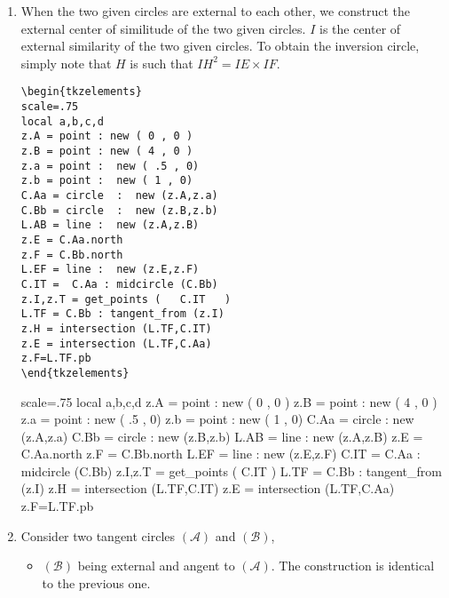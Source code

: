 \begin{enumerate}[label=(\roman*)]
\item When the two given circles are external to each other,  we  construct  the external center of similitude of the two given circles.
$I$ is the center of external similarity of the two given circles. To obtain the inversion circle, simply note that $H$ is such that $IH^2= IE\times IF$. \label{tangent_from}

\begin{minipage}{.4\textwidth}
\begin{verbatim}
\begin{tkzelements}
scale=.75
local a,b,c,d
z.A = point : new ( 0 , 0 )
z.B = point : new ( 4 , 0 )
z.a = point :  new ( .5 , 0)
z.b = point :  new ( 1 , 0)
C.Aa = circle  :  new (z.A,z.a)
C.Bb = circle  :  new (z.B,z.b)
L.AB = line :  new (z.A,z.B)
z.E = C.Aa.north
z.F = C.Bb.north
L.EF = line :  new (z.E,z.F)
C.IT =  C.Aa : midcircle (C.Bb)
z.I,z.T = get_points (   C.IT   ) 
L.TF = C.Bb : tangent_from (z.I)
z.H = intersection (L.TF,C.IT)
z.E = intersection (L.TF,C.Aa)
z.F=L.TF.pb
\end{tkzelements}
\end{verbatim}
\end{minipage}
\begin{minipage}{.6\textwidth}
\begin{tkzelements}
scale=.75
local a,b,c,d
z.A = point : new ( 0 , 0 )
z.B = point : new ( 4 , 0 )
z.a = point :  new ( .5 , 0)
z.b = point :  new ( 1 , 0)
C.Aa = circle  :  new (z.A,z.a)
C.Bb = circle  :  new (z.B,z.b)
L.AB = line :  new (z.A,z.B)
z.E = C.Aa.north
z.F = C.Bb.north
L.EF = line :  new (z.E,z.F)
C.IT =  C.Aa : midcircle (C.Bb)
z.I,z.T = get_points (	C.IT	) 
L.TF = C.Bb : tangent_from (z.I)
z.H = intersection (L.TF,C.IT)
z.E = intersection (L.TF,C.Aa)
z.F=L.TF.pb
\end{tkzelements}
\end{minipage}


\item Consider two tangent circles $(\mathcal{A})$ and $(\mathcal{B})$,
\begin{itemize}

\item $(\mathcal{B})$ being external and angent to $(\mathcal{A})$. The construction is identical to the previous one.


\end{itemize}
\end{enumerate}
